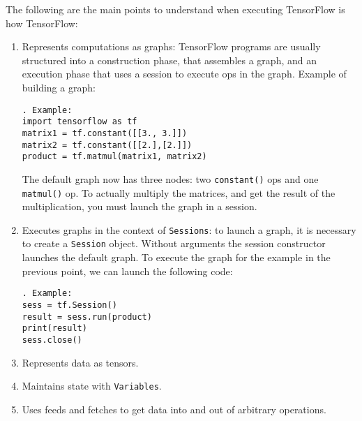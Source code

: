 \documentclass[11pt,a4paper]{article}
\begin{document}
The following are the main points to understand when executing TensorFlow is how TensorFlow: 
\begin{enumerate}
	\item Represents computations as graphs: TensorFlow programs are usually structured into a construction phase, that assembles a graph, and an execution phase that uses a session to execute ops in the graph. Example of building a graph: 
	\begin{lstlisting}. Example: 
import tensorflow as tf
matrix1 = tf.constant([[3., 3.]])
matrix2 = tf.constant([[2.],[2.]])
product = tf.matmul(matrix1, matrix2)
\end{lstlisting}
The default graph now has three nodes: two \texttt{constant()} ops and one \texttt{matmul()} op. To actually multiply the matrices, and get the result of the multiplication, you must launch the graph in a session.
	\item Executes graphs in the context of \texttt{Sessions}: to launch a graph, it is necessary to create a \texttt{Session} object. Without arguments the session constructor launches the default graph. To execute the graph for the example in the previous point, we can launch the following code: 
	\begin{lstlisting}. Example: 
sess = tf.Session()
result = sess.run(product)
print(result)
sess.close() 
\end{lstlisting}
	
	\item Represents data as tensors. 
	\item Maintains state with \texttt{Variables}. 
	\item Uses feeds and fetches to get data into and out of arbitrary operations. 
\end{enumerate}
\end{document}
